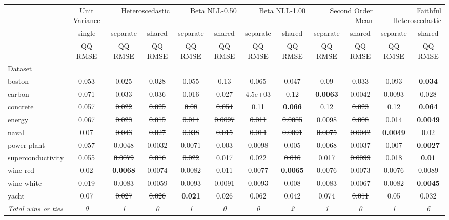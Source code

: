 \begin{tabular}{l|c|cc|cc|cc|cc|cc}
\toprule
{} & {Unit Variance} & \multicolumn{2}{r}{Heteroscedastic} & \multicolumn{2}{r}{Beta NLL-0.50} & \multicolumn{2}{r}{Beta NLL-1.00} & \multicolumn{2}{r}{Second Order Mean} & \multicolumn{2}{r}{Faithful Heteroscedastic} \\
{} & {single} & {separate} & {shared} & {separate} & {shared} & {separate} & {shared} & {separate} & {shared} & {separate} & {shared} \\
{} & {QQ RMSE} & {QQ RMSE} & {QQ RMSE} & {QQ RMSE} & {QQ RMSE} & {QQ RMSE} & {QQ RMSE} & {QQ RMSE} & {QQ RMSE} & {QQ RMSE} & {QQ RMSE} \\
{Dataset} & {} & {} & {} & {} & {} & {} & {} & {} & {} & {} & {} \\
\midrule
boston & 0.053 & \sout{0.025} & \sout{0.028} & 0.055 & 0.13 & 0.065 & 0.047 & 0.09 & \sout{0.033} & 0.093 & \textbf{0.034} \\
carbon & 0.071 & 0.033 & \sout{0.036} & 0.016 & 0.027 & \sout{4.5e+03} & \sout{0.12} & \textbf{0.0063} & \sout{0.0042} & 0.0093 & 0.028 \\
concrete & 0.057 & \sout{0.022} & \sout{0.025} & \sout{0.08} & \sout{0.054} & 0.11 & \textbf{0.066} & 0.12 & \sout{0.023} & 0.12 & \textbf{0.064} \\
energy & 0.067 & \sout{0.023} & \sout{0.015} & \sout{0.014} & \sout{0.0097} & \sout{0.011} & \sout{0.0085} & 0.0098 & \sout{0.008} & 0.014 & \textbf{0.0049} \\
naval & 0.07 & \sout{0.043} & \sout{0.027} & \sout{0.038} & \sout{0.015} & \sout{0.014} & \sout{0.0091} & \sout{0.0075} & \sout{0.0042} & \textbf{0.0049} & 0.02 \\
power plant & 0.057 & \sout{0.0048} & \sout{0.0032} & \sout{0.0071} & \sout{0.003} & 0.0098 & \sout{0.005} & \sout{0.0068} & \sout{0.0037} & 0.007 & \textbf{0.0027} \\
superconductivity & 0.055 & \sout{0.0079} & \sout{0.016} & \sout{0.022} & 0.017 & 0.022 & \sout{0.016} & 0.017 & \sout{0.0099} & 0.018 & \textbf{0.01} \\
wine-red & 0.02 & \textbf{0.0068} & 0.0074 & 0.0082 & 0.011 & 0.0077 & \textbf{0.0065} & 0.0076 & 0.0073 & 0.0076 & 0.0089 \\
wine-white & 0.019 & 0.0083 & 0.0059 & 0.0093 & 0.0091 & 0.0093 & 0.008 & 0.0083 & 0.0067 & 0.0082 & \textbf{0.0045} \\
yacht & 0.07 & \sout{0.027} & \sout{0.026} & \textbf{0.021} & 0.026 & 0.062 & 0.042 & 0.074 & \sout{0.011} & 0.05 & 0.032 \\
\textit{{Total wins or ties}} & \textit{0} & \textit{1} & \textit{0} & \textit{1} & \textit{0} & \textit{0} & \textit{2} & \textit{1} & \textit{0} & \textit{1} & \textit{6} \\
\bottomrule
\end{tabular}
